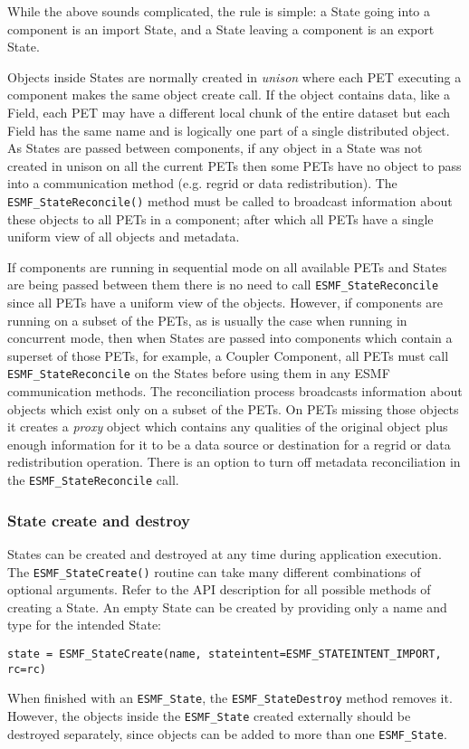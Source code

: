 While the above sounds complicated, the rule is simple:
a State going into a component is an import State, and a 
State leaving a component is an export State.

Objects inside States are normally created in {\it unison} where
each PET executing a component makes the same object create call.
If the object contains data, like a Field, each PET may have a
different local chunk of the entire dataset but each Field has
the same name and is logically one part of a single distributed 
object.   As States are passed between components, if any object
in a State was not created in unison on all the current PETs 
then some PETs have no object to pass into a
communication method (e.g. regrid or data redistribution).
The {\tt ESMF\_StateReconcile()} method must be called to broadcast 
information about these objects to all PETs in a component;
after which all PETs have a single uniform view of all objects and metadata.  

If components are running in sequential mode on all available PETs
and States are being passed between them there is no need to call 
{\tt ESMF\_StateReconcile} since all PETs have a uniform view of the objects.
However, if components are running on a subset of the PETs, as is
usually the case when running in concurrent mode, then when States
are passed into components which contain a superset of those PETs,
for example, a Coupler Component, all PETs must call {\tt ESMF\_StateReconcile}
on the States before using them in any ESMF communication methods.
The reconciliation process broadcasts information about objects
which exist only on a subset of the PETs.  On PETs missing those
objects it creates a {\it proxy} object which contains any
qualities of the original object plus enough information for it
to be a data source or destination for a regrid or data redistribution
operation.  There is an option to turn off metadata reconciliation in the 
{\tt ESMF\_StateReconcile} call.

\subsubsection{State create and destroy}

States can be created and destroyed at any time during
application execution.  The {\tt ESMF\_StateCreate()} routine
can take many different combinations of optional arguments.  Refer
to the API description for all possible methods of creating a State.
An empty State can be created by providing only a name and type for
the intended State:

{\tt state = ESMF\_StateCreate(name, stateintent=ESMF\_STATEINTENT\_IMPORT, rc=rc)}

When finished with an {\tt ESMF\_State}, the {\tt ESMF\_StateDestroy} method
removes it.  However, the objects inside the {\tt ESMF\_State}
created externally should be destroyed separately,
since objects can be added to more than one {\tt ESMF\_State}.
